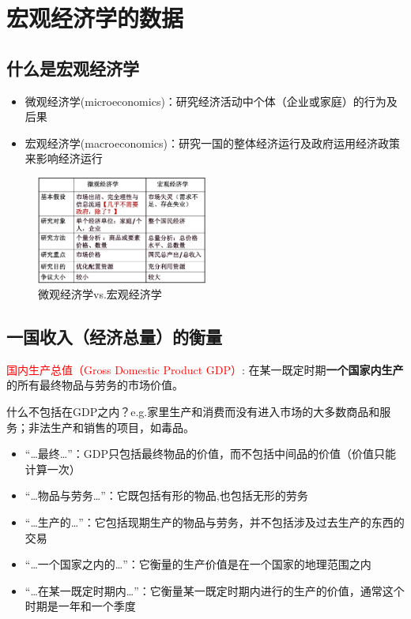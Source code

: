 \newpage
\section{宏观经济学的数据}

\subsection{什么是宏观经济学}
\begin{itemize}
  \item 微观经济学(microeconomics)：研究经济活动中个体（企业或家庭）的行为及后果
  \item 宏观经济学(macroeconomics)：研究一国的整体经济运行及政府运用经济政策来影响经济运行
\end{itemize}

\begin{figure}[H]
  \centering
  \includegraphics[width=0.5\textwidth]{微观经济学vs宏观经济学.png}
  \caption{微观经济学vs.宏观经济学}
\end{figure}

\subsection{一国收入（经济总量）的衡量}
\textcolor{red}{国内生产总值（Gross Domestic Product GDP）}: 在某一既定时期\textbf{一个国家内生产}的所有最终物品与劳务的市场价值。

什么不包括在GDP之内？e.g.家里生产和消费而没有进入市场的大多数商品和服务；非法生产和销售的项目，如毒品。
\begin{itemize}
  \item “…最终…”：GDP只包括最终物品的价值，而不包括中间品的价值（价值只能计算一次）
  \item “…物品与劳务…”：它既包括有形的物品,也包括无形的劳务
  \item “…生产的…”：它包括现期生产的物品与劳务，并不包括涉及过去生产的东西的交易
  \item “…一个国家之内的…”：它衡量的生产价值是在一个国家的地理范围之内
  \item “…在某一既定时期内…”：它衡量某一既定时期内进行的生产的价值，通常这个时期是一年和一个季度
\end{itemize}

